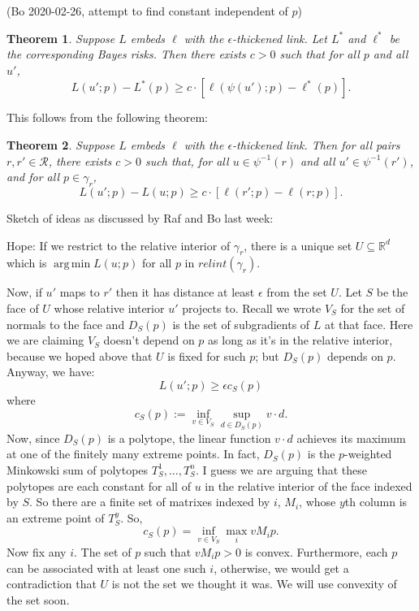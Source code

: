 \documentclass{article}
\newcommand{\reals}{\mathbb{R}}
\newcommand{\R}{\mathcal{R}}
\DeclareMathOperator*{\argmin}{arg\,min}
\newtheorem{theorem}{Theorem}
\theoremstyle{definition}
\begin{document}
\break
(Bo 2020-02-26, attempt to find constant independent of $p$)

\begin{theorem}
  Suppose $L$ embeds $\ell$ with the $\epsilon$-thickened link.
  Let $L^*$ and $\ell^*$ be the corresponding Bayes risks.
  Then there exists $c > 0$ such that for all $p$ and all $u'$,
  \[ L(u';p) - L^*(p) \geq c \cdot \left[ \ell(\psi(u');p) - \ell^*(p) \right]  . \]
\end{theorem}

This follows from the following theorem:
\begin{theorem}
  Suppose $L$ embeds $\ell$ with the $\epsilon$-thickened link.
  Then for all pairs $r,r' \in \R$, there exists $c > 0$ such that, for all $u \in \psi^{-1}(r)$ and all $u' \in \psi^{-1}(r')$, and for all $p \in \gamma_r$,
  \[ L(u';p) - L(u;p) \geq c \cdot \left[ \ell(r';p) - \ell(r;p) \right] . \]
\end{theorem}
Sketch of ideas as discussed by Raf and Bo last week:

Hope: If we restrict to the relative interior of $\gamma_r$, there is a unique set $U \subseteq \reals^d$ which is $\argmin L(u;p)$ for all $p$ in $relint(\gamma_r)$.

Now, if $u'$ maps to $r'$ then it has distance at least $\epsilon$ from the set $U$.
Let $S$ be the face of $U$ whose relative interior $u'$ projects to.
Recall we wrote $V_S$ for the set of normals to the face and $D_S(p)$ is the set of subgradients of $L$ at that face.
Here we are claiming $V_S$ doesn't depend on $p$ as long as it's in the relative interior, because we hoped above that $U$ is fixed for such $p$; but $D_S(p)$ depends on $p$.
Anyway, we have:
  \[ L(u';p) \geq \epsilon c_S(p) \]
where
  \[ c_S(p) := \inf_{v \in V_S} \sup_{d \in D_S(p)} v \cdot d . \]
Now, since $D_S(p)$ is a polytope, the linear function $v \cdot d$ achieves its maximum at one of the finitely many extreme points.
In fact, $D_S(p)$ is the $p$-weighted Minkowski sum of polytopes $T_S^1,\dots,T_S^n$.
I guess we are arguing that these polytopes are each constant for all of $u$ in the relative interior of the face indexed by $S$.
So there are a finite set of matrixes indexed by $i$, $M_i$, whose $y$th column is an extreme point of $T_S^y$.
So,
  \[ c_S(p) = \inf_{v \in V_S} \max_i v M_i p . \]
Now fix any $i$.
The set of $p$ such that $v M_i p > 0$ is convex.
Furthermore, each $p$ can be associated with at least one such $i$, otherwise, we would get a contradiction that $U$ is not the set we thought it was.
We will use convexity of the set soon.
\end{document}
